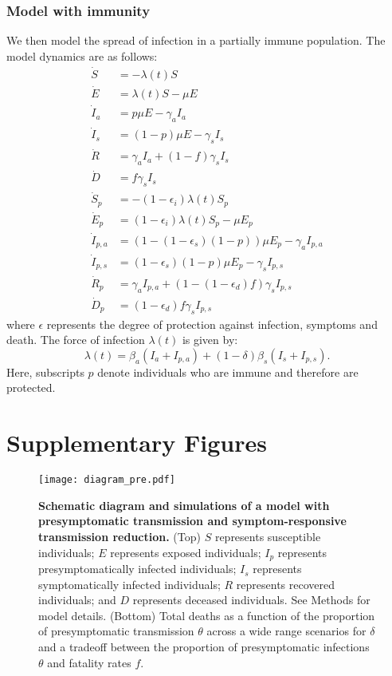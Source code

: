 \documentclass[12pt]{article}
\begin{document}
\subsubsection*{Model with immunity}

We then model the spread of infection in a partially immune population.
The model dynamics are as follows:
\begin{align}
\dot{S} &= -\lambda (t) S \\
\dot{E} &= \lambda (t) S - \mu E\\
\dot{I}_a &= p \mu E - \gamma_a I_a\\
\dot{I}_s &= (1-p) \mu E -\gamma_s I_s\\
\dot{R} &= \gamma_a I_a + (1-f) \gamma_s I_s \\
\dot{D} &= f \gamma_s I_s\\
\dot{S}_p &= - (1-\epsilon_i) \lambda (t) S_p \\
\dot{E}_p &= (1-\epsilon_i) \lambda (t) S_p - \mu E_p\\
\dot{I}_{p, a} &= (1 - (1-\epsilon_s) (1-p)) \mu E_p - \gamma_a I_{p,a}\\
\dot{I}_{p, s} &= (1-\epsilon_s) (1-p) \mu E_p -\gamma_s I_{p,s}\\
\dot{R}_p &= \gamma_a I_{p,a} + (1-(1-\epsilon_d) f) \gamma_s I_{p,s} \\
\dot{D}_p &= (1-\epsilon_d) f \gamma_s I_{p,s}
\end{align}
where $\epsilon$ represents the degree of protection against infection, symptoms and death. 
The force of infection $\lambda(t)$ is given by:
\begin{equation}
\lambda(t) = \beta_a (I_a + I_{p,a}) + (1-\delta) \beta_s (I_s + I_{p,s}).
\end{equation}
Here, subscripts $p$ denote individuals who are immune and therefore are protected.

\pagebreak

\section*{Supplementary Figures}

\begin{figure}[!h]
\begin{center}
\texttt{[image: diagram\_pre.pdf]}
\caption{
\textbf{Schematic diagram and simulations of a model with presymptomatic transmission and symptom-responsive transmission reduction.}
(Top) $S$ represents susceptible individuals; $E$ represents exposed individuals; $I_p$ represents presymptomatically infected individuals; $I_s$ represents symptomatically infected individuals; $R$ represents recovered individuals; and $D$ represents deceased individuals. See Methods for model details.
(Bottom) Total deaths as a function of the proportion of presymptomatic transmission $\theta$ across a wide range scenarios for $\delta$ and a tradeoff between the proportion of presymptomatic infections $\theta$ and fatality rates $f$.
}
\end{center}
\end{figure}
\end{document}
